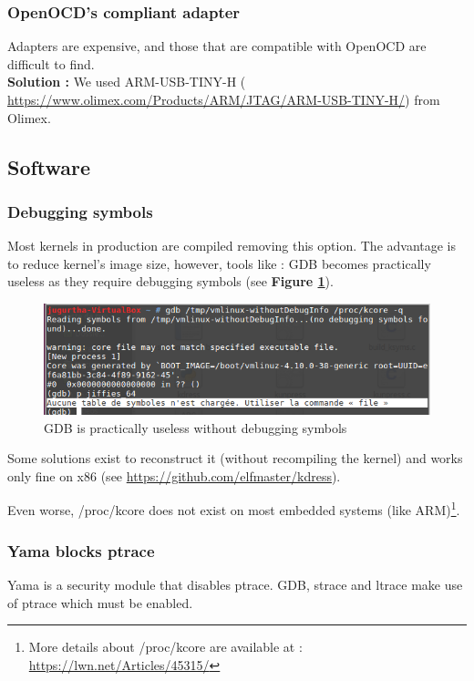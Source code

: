 \subsubsection{OpenOCD's compliant adapter}
Adapters are expensive, and those that are compatible with OpenOCD are difficult to find.\\
\textbf{Solution : } We used ARM-USB-TINY-H ({\color{blue} \url{https://www.olimex.com/Products/ARM/JTAG/ARM-USB-TINY-H/}}) from Olimex.

\subsection{Software}

\subsubsection{Debugging symbols}
Most kernels in production are compiled removing this option. The advantage is to reduce kernel's image size, however, tools like : GDB becomes practically useless as they require debugging symbols (see \textbf{Figure \ref{GDB is practically useless without debugging symbols}}). 

\begin{figure}[H]
		\centering
        \includegraphics[scale=0.40]{img/issues/no-debug-symbol.png}
        \caption{GDB is practically useless without debugging symbols}
        \label{GDB is practically useless without debugging symbols}
    \end{figure}


Some solutions exist to reconstruct it (without recompiling the kernel) and works only fine on x86 (see {\color{blue}\url{https://github.com/elfmaster/kdress}}).




Even worse, /proc/kcore does not exist on most embedded systems (like ARM)\footnote{More details about /proc/kcore are available at :  {\color{blue}\url{https://lwn.net/Articles/45315/}}}.


\subsubsection{Yama blocks ptrace}
Yama is a security module that disables ptrace. GDB, strace and ltrace make use of ptrace which must be enabled.\\

